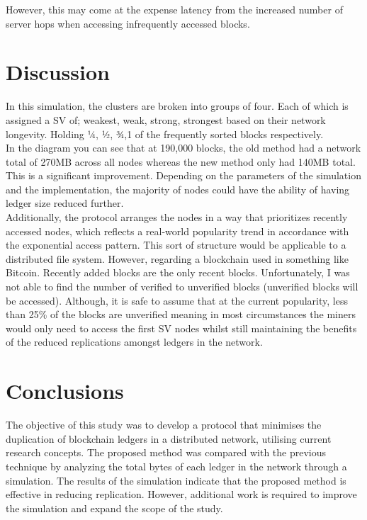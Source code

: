 \documentclass{article}
\begin{document}
\begin{CJK}{UTF8}{gbsn}
However, this may come at the expense latency from the increased number of server hops when accessing infrequently accessed blocks.

\section{Discussion}
In this simulation, the clusters are broken into groups of four. Each of which is assigned a SV of; weakest, weak, strong, strongest based on their network longevity. Holding ¼, ½, ¾,1 of the frequently sorted blocks respectively.\\

In the diagram you can see that at 190,000 blocks, the old method had a network total of 270MB across all nodes whereas the new method only had 140MB total. This is a significant improvement. Depending on the parameters of the simulation and the implementation, the majority of nodes could have the ability of having ledger size reduced further.\\

Additionally, the protocol arranges the nodes in a way that prioritizes recently accessed nodes, which reflects a real-world popularity trend in accordance with the exponential access pattern. This sort of structure would be applicable to a distributed file system. However, regarding a blockchain used in something like Bitcoin. Recently added blocks are the only recent blocks. Unfortunately, I was not able to find the number of verified to unverified blocks (unverified blocks will be accessed). Although, it is safe to assume that at the current popularity, less than 25\% of the blocks are unverified meaning in most circumstances the miners would only need to access the first SV nodes whilst still maintaining the benefits of the reduced replications amongst ledgers in the network.

\section{Conclusions}
The objective of this study was to develop a protocol that minimises the duplication of blockchain ledgers in a distributed network, utilising current research concepts. The proposed method was compared with the previous technique by analyzing the total bytes of each ledger in the network through a simulation. The results of the simulation indicate that the proposed method is effective in reducing replication. However, additional work is required to improve the simulation and expand the scope of the study.


\end{CJK}
\end{document}
